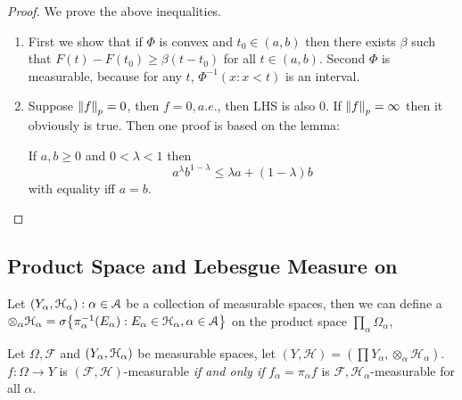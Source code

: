 \begin{proof}
    We prove the above inequalities. 
    \begin{enumerate}
        \item First we show that if \(\Phi\) is convex and \(t_{0}\in (a,b)\) then there exists \(\beta\) such that \(F(t) - F(t_{0}) \geq \beta(t-t_{0})\) for all \( t \in (a,b)\).  Second \(\Phi\) is measurable, because for any \(t\), \(\Phi^{-1} ({x: x < t})\) is an interval. 
            
        \item Suppose \(\norm{f}_{p} = 0\), then \(f = 0, a.e.\), then LHS is also \(0\). If \(\norm{f}_{p} = \infty\) then it obviously is true. Then one proof is based on the lemma:
        \begin{lemma}
            If \(a,b \geq 0\) and \(0 < \lambda <1\) then 
            \begin{equation*}
                a^{\lambda} b^{1-\lambda} \leq \lambda a +(1-\lambda) b
            \end{equation*}
            with equality iff \(a = b\). 
        \end{lemma}
    \end{enumerate}
\end{proof}


\subsection{Product Space and Lebesgue Measure on }


Let \(\pqty{Y_{\alpha}, \mathcal{H}_{\alpha}}: \alpha\in \mathcal{A} \) be a collection of measurable spaces, then we can define a  \(\otimes_{\alpha} \mathcal{H}_{\alpha} = \sigma\Bqty{\pi_{\alpha}^{-1} (E_{\alpha}): E_{\alpha} \in \mathcal{H}_{\alpha}, \alpha \in \mathcal{A}}\) on the product space \(\prod_{\alpha} \Omega_{\alpha}\),  
\begin{proposition}
    Let \(\Omega, \mathcal{F}\) and \(\pqty{Y_{\alpha}, \mathcal{H}_{\alpha}}\) be measurable spaces, let \((Y, \mathcal{H}) = (\prod Y_{\alpha}, \otimes_{\alpha} \mathcal{H}_{\alpha})\). \(f : \Omega \to Y\) is \((\mathcal{F}, \mathcal{H})\)-measurable \textit{if and only if} \(f_{\alpha} = \pi_{\alpha} f\) is \(\mathcal{F} ,\mathcal{H}_{\alpha}\)-measurable for all \(\alpha\).
\end{proposition} 

